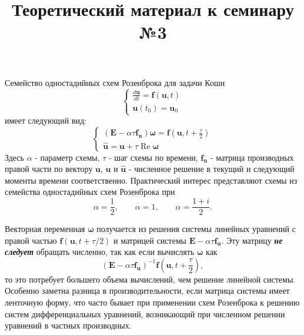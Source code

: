 \documentclass{article}
\title{Теоретический материал к семинару №3}
\date{}
\begin{document}
\maketitle

Семейство одностадийных схем Розенброка для задачи Коши
\begin{equation} \label{c3eq1}
	\begin{cases}
		\displaystyle \frac{d\mathbf{u}}{dt} = \mathbf{f} \left( \mathbf{u}, t \right) \\
		\mathbf{u}(t_0) = \mathbf{u}_0
	\end{cases}
\end{equation}
имеет следующий вид:
\begin{equation} \label{c3eq2}
	\begin{cases}
		\displaystyle \left( \mathbf{E} - \alpha \tau \mathbf{f_u} \right) \boldsymbol{\omega}= \mathbf{f} \left( \mathbf{u}, t + \frac{\tau}{2} \right) \\
		\mathbf{\hat{u}} = \mathbf{u} + \tau \operatorname{Re} \boldsymbol{\omega}
	\end{cases}
\end{equation}
Здесь $\alpha$ - параметр схемы, $\tau$ - шаг схемы по времени, $\mathbf{f_u}$ - матрица производных правой части по вектору $\mathbf{u}$, $\mathbf{u}$ и $\mathbf{\hat{u}}$ - численное решение в текущий и следующий моменты времени соответственно. Практический интерес представляют схемы из семейства одностадийных схем Розенброка при  
\begin{equation} \nonumber
\alpha = \frac{1}{2},
\qquad
\alpha = 1,
\qquad
\alpha = \frac{1+i}{2}.
\end{equation}

Векторная переменная $\boldsymbol{\omega}$ получается из решения системы линейных уравнений с правой частью $\mathbf{f} \left( \mathbf{u}, t + \tau/2 \right)$ и матрицей системы $\mathbf{E} - \alpha \tau \mathbf{f_u}$. Эту матрицу \textbf{\textit{не следует}} обращать численно, так как если вычислять  $\boldsymbol{\omega}$ как 
\begin{equation} \nonumber
	\left( \mathbf{E} - \alpha \tau \mathbf{f_u} \right)^{-1} \mathbf{f} \left( \mathbf{u}, t + \frac{\tau}{2} \right),
\end{equation}
то это потребует большего объема вычислений, чем решение линейной системы. Особенно заметна разница в производительности, если матрица системы имеет ленточную форму, что часто бывает при применении схем Розенброка к решению систем дифференциальных уравнений, возникающий при численном решении уравнений в частных производных.
\end{document}
